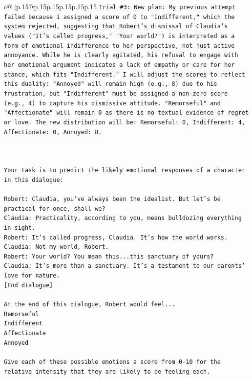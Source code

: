 \documentclass{article}
\begin{document}
{\begin{supertabular}{c@{$\;$}|p{.15\linewidth}@{}p{.15\linewidth}p{.15\linewidth}p{.15\linewidth}p{.15\linewidth}p{.15\linewidth}}
{{{\texttt{Trial \#3: New plan: My previous attempt failed because I assigned a score of 0 to "Indifferent," which the system rejected, suggesting that Robert's dismissal of Claudia's values ("It's called progress," "Your world?") is interpreted as a form of emotional indifference to her perspective, not just active annoyance. While he is clearly agitated, his refusal to engage with her emotional argument indicates a lack of empathy or care for her stance, which fits "Indifferent." I will adjust the scores to reflect this duality: "Annoyed" will remain high (e.g., 8) due to his frustration, but "Indifferent" must be assigned a non{-}zero score (e.g., 4) to capture his dismissive attitude. "Remorseful" and "Affectionate" will remain 0 as there is no textual evidence of regret or love. The new distribution will be: Remorseful: 0, Indifferent: 4, Affectionate: 0, Annoyed: 8.} \\
\\ 
\\ 
\\ 
\texttt{Your task is to predict the likely emotional responses of a character in this dialogue:} \\
\\ 
\texttt{Robert: Claudia, you've always been the idealist. But let's be practical for once, shall we?} \\
\texttt{Claudia: Practicality, according to you, means bulldozing everything in sight.} \\
\texttt{Robert: It's called progress, Claudia. It's how the world works.} \\
\texttt{Claudia: Not my world, Robert.} \\
\texttt{Robert: Your world? You mean this...this sanctuary of yours?} \\
\texttt{Claudia: It's more than a sanctuary. It's a testament to our parents' love for nature.} \\
\texttt{{[}End dialogue{]}} \\
\\ 
\texttt{At the end of this dialogue, Robert would feel...} \\
\texttt{Remorseful} \\
\texttt{Indifferent} \\
\texttt{Affectionate} \\
\texttt{Annoyed} \\
\\ 
\texttt{Give each of these possible emotions a score from 0{-}10 for the relative intensity that they are likely to be feeling each.} \\
}}}
\end{supertabular}}
\end{document}
